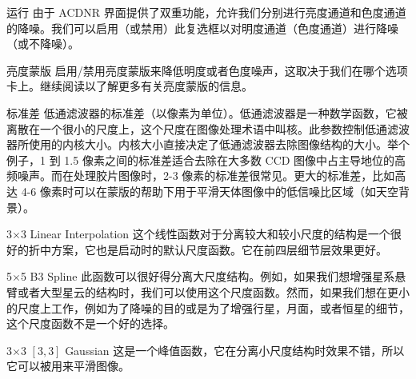 \begin{nounexplanation}
  \item[运行\translate{Apply}] 由于 ACDNR 界面提供了双重功能，允许我们分别进行亮度通道和色度通道的降噪。我们可以启用（或禁用）此复选框以对明度通道（色度通道）进行降噪（或不降噪）。

  \item[亮度蒙版\translate{Lightness mask}] 启用/禁用亮度蒙版来降低明度或者色度噪声，这取决于我们在哪个选项卡上。继续阅读以了解更多有关亮度蒙版的信息。
  
  \item[标准差\translate{Std.Dev.}] 低通滤波器的标准差（以像素为单位）。低通滤波器是一种数学函数，它被离散在一个很小的尺度上，这个尺度在图像处理术语中叫核。此参数控制低通滤波器所使用的内核大小。内核大小直接决定了低通滤波器去除图像结构的大小。举个例子，1 到 1.5 像素之间的标准差适合去除在大多数 CCD 图像中占主导地位的高频噪声。而在处理胶片图像时，2-3 像素的标准差很常见。更大的标准差，比如高达 4-6 像素时可以在蒙版的帮助下用于平滑天体图像中的低信噪比区域（如天空背景）。
    \begin{nounexplanation}
      \item[3$\times$3 Linear Interpolation] 这个线性函数对于分离较大和较小尺度的结构是一个很好的折中方案，它也是启动时的默认尺度函数。它在前四层细节层效果更好。
      \item[5$\times$5 B3 Spline] 此函数可以很好得分离大尺度结构。例如，如果我们想增强星系悬臂或者大型星云的结构时，我们可以使用这个尺度函数。然而，如果我们想在更小的尺度上工作，例如为了降噪的目的或是为了增强行星，月面，或者恒星的细节，这个尺度函数不是一个好的选择。
      \item[3$\times$3 {$[3,3]$} Gaussian] 这是一个峰值函数，它在分离小尺度结构时效果不错，所以它可以被用来平滑图像。
    \end{nounexplanation}
\end{nounexplanation}


